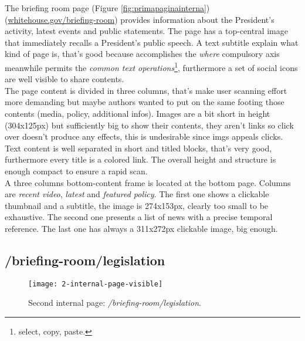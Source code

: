 \documentclass[
10pt, %
a4paper, %
oneside, %
headinclude,footinclude, %
BCOR5mm, %
]{scrartcl}
\begin{document}
	The briefing room page (Figure \ref{fig:primapaginainterna}) (\href{http://www.whitehouse.gov/briefing-room}{whitehouse.gov/briefing-room}) provides information about the President's activity, latest events and public statements. The page has a top-central image that immediately recalls a President's public speech. A text subtitle explain what kind of page is, that's good because accomplishes the \emph{where} compulsory axis meanwhile permits the \emph{common text operations}\footnote{select, copy, paste.}, furthermore a set of social icons are well visible to share contents. \\
	The page content is divided in three columns, that's make user scanning effort more demanding but maybe authors wanted to put on the same footing those contents (media, policy, additional infos). Images are a bit short in height (304x125px) but sufficiently big to show their contents, they aren't links so click over doesn't produce any effects, this is undesirable since imgs appeals clicks. \\
	Text content is well separated in short and titled blocks, that's very good, furthermore every title is a colored link. The overall height and structure is enough compact to ensure a rapid scan. \\
	A three columns bottom-content frame is located at the bottom page. Columns are \emph{recent video}, \emph{latest} and \emph{featured policy}. The first one shows a clickable thumbnail and a subtitle, the image is 274x153px, clearly too small to be exhaustive. The second one presents a list of news with a precise temporal reference. The last one has always a 311x272px clickable image, big enough.

	\newpage
	\subsection{/briefing-room/legislation}
	\label{secondapaginainterna}

	\begin{figure}[h!]
	\centering 
	\centerline{\texttt{[image: 2-internal-page-visible]}}
	\caption[Second internal page: /briefing-room/legislation]{Second internal page: \emph{/briefing-room/legislation}.}
	\label{fig:secondapaginainterna} 
	\end{figure}
\end{document}
